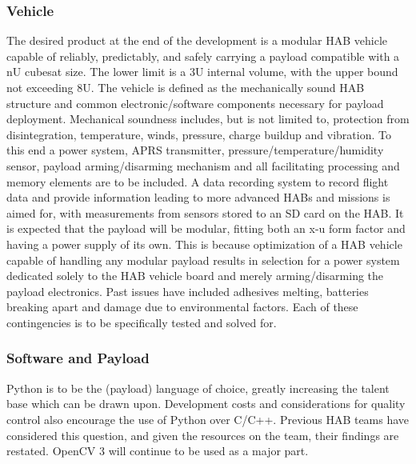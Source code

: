 \documentclass[conference]{IEEEtran} %
\begin{document}
\subsubsection{Vehicle}
\label{deliverables-vehicle}
The desired product at the end of the development is a modular HAB vehicle capable of reliably, predictably, and safely carrying a payload compatible with a nU cubesat size. The lower limit is a 3U internal volume, with the upper bound not exceeding 8U.
The vehicle is defined as the mechanically sound HAB structure and common electronic/software components necessary for payload deployment.
Mechanical soundness includes, but is not limited to, protection from disintegration, temperature, winds, pressure, charge buildup and vibration.
To this end a power system, APRS transmitter, pressure/temperature/humidity sensor, payload arming/disarming mechanism and all facilitating processing and memory elements are to be included.
A data recording system to record flight data and provide information leading to more advanced HABs and missions is aimed for, with measurements from sensors stored to an SD card on the HAB.
It is expected that the payload will be modular, fitting both an x-u form factor and having a power supply of its own.
This is because optimization of a HAB vehicle capable of handling any modular payload results in selection for a power system dedicated solely to the HAB vehicle board and merely arming/disarming the payload electronics.
Past issues have included adhesives melting, batteries breaking apart and damage due to environmental factors. Each of these contingencies is to be specifically tested and solved for.

\subsubsection{Software and Payload}
\label{deliverables-payload}
Python is to be the (payload) language of choice, greatly increasing the talent base which can be drawn upon. Development costs and considerations for quality control also encourage the use of Python over C/C++.
Previous HAB teams have considered this question, and given the resources on the team, their findings are restated. OpenCV 3 will continue to be used as a major part.
\end{document}
